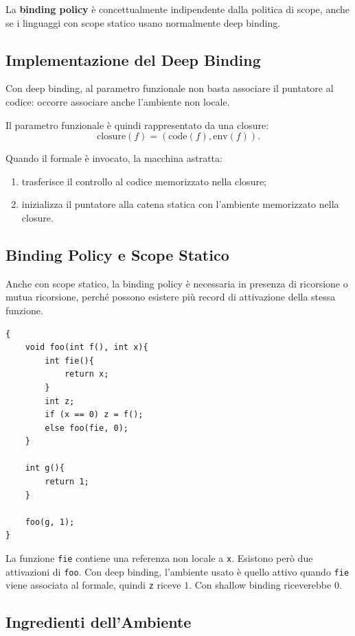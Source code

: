 \documentclass{article}
\begin{document}
La \textbf{binding policy} è concettualmente indipendente dalla politica di scope, anche se i linguaggi con scope statico usano normalmente deep binding.

\subsection{Implementazione del Deep Binding}

Con deep binding, al parametro funzionale non basta associare il puntatore al codice: occorre associare anche l'ambiente non locale.

Il parametro funzionale è quindi rappresentato da una closure:
\[
\mathrm{closure}(f) = (\mathrm{code}(f), \mathrm{env}(f)).
\]

Quando il formale è invocato, la macchina astratta:
\begin{enumerate}
  \item trasferisce il controllo al codice memorizzato nella closure;
  \item inizializza il puntatore alla catena statica con l'ambiente memorizzato nella closure.
\end{enumerate}

\subsection{Binding Policy e Scope Statico}

Anche con scope statico, la binding policy è necessaria in presenza di ricorsione o mutua ricorsione, perché possono esistere più record di attivazione della stessa funzione.

\begin{lstlisting}
{
    void foo(int f(), int x){
        int fie(){
            return x;
        }
        int z;
        if (x == 0) z = f();
        else foo(fie, 0);
    }

    int g(){
        return 1;
    }

    foo(g, 1);
}
\end{lstlisting}

La funzione \texttt{fie} contiene una referenza non locale a \texttt{x}. Esistono però due attivazioni di \texttt{foo}. Con deep binding, l'ambiente usato è quello attivo quando \texttt{fie} viene associata al formale, quindi \texttt{z} riceve $1$. Con shallow binding riceverebbe $0$.

\subsection{Ingredienti dell'Ambiente}
\end{document}
